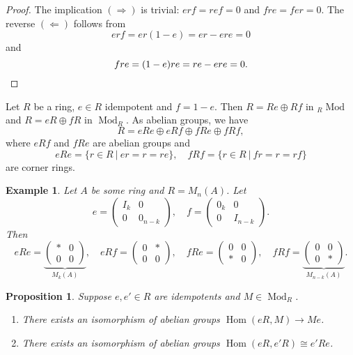\documentclass[10pt, a4paper]{article}
\newtheorem{proposition}[thm]{Proposition}
\newtheorem{example}[thm]{Example}
\newenvironment{noticeC}{%
  \tcolorbox[%
  notitle,
  empty,
  enhanced,  %
  breakable,
  coltext=black, 
  fontupper=\rmfamily,
  noparskip,
  sharp corners,
  boxrule=-1pt,  %
  frame hidden,
  left=7pt,  %
  right=7pt,
  top=5pt,
  bottom=5pt,
  before skip=2.5ex plus 2pt,
  after skip=2.5ex plus 2pt,
  overlay unbroken and last={%
  },
  ]}
{\endtcolorbox}
\newenvironment{myproof}%
  {\begin{noticeC}\begin{proof}}%
  {\end{proof}\end{noticeC}}
\DeclareMathOperator{\ho}{Hom}
\DeclareMathOperator{\mo}{Mod}
\begin{document}
\begin{myproof}
  The implication $(\Rightarrow)$ is trivial: $erf = ref = 0$ and $fre = fer = 0$.
  The reverse $(\Leftarrow)$ follows from 
  $$erf = er(1 - e) = er - ere = 0$$
  and \begin{equation*}
    fre = (1 - e) re = re - ere = 0. \qedhere
  \end{equation*}
\end{myproof}

Let $R$ be a ring, $e \in R$ idempotent and $f = 1 - e$.
Then $R = Re \oplus Rf$ in ${}_R \mo$ and $R = eR \oplus fR$ in $\mo_R$.
As abelian groups, we have $$R = eRe \oplus eRf \oplus fRe \oplus fRf,$$
where $eRf$ and $fRe$ are abelian groups and 
$$eRe = \{r \in R\ |\ er = r = re\},\quad fRf = \{ r \in R\ |\ fr = r = rf \}$$
are corner rings.

\begin{example}
  Let $A$ be some ring and $R = M_n (A)$.
  Let $$e = \begin{pmatrix}
    I_k & 0\\
    0 & 0_{n - k}
  \end{pmatrix},\quad f = \begin{pmatrix}
    0_k & 0\\
    0 & I_{n - k}
  \end{pmatrix}.$$
  Then $$eRe = \underbrace{\begin{pmatrix}
    * & 0\\
    0 & 0
  \end{pmatrix}}_{M_k (A)},\quad eRf = \begin{pmatrix}
    0 & *\\
    0 & 0
  \end{pmatrix},\quad fRe = \begin{pmatrix}
    0 & 0\\
    * & 0
  \end{pmatrix},\quad fRf = \underbrace{\begin{pmatrix}
    0 & 0\\
    0 & *
  \end{pmatrix}}_{M_{n - k} (A)}.$$
\end{example}

\begin{proposition}
  Suppose $e, e' \in R$ are idempotents and $M \in \mo _R$.
  \begin{enumerate}
    \item There exists an isomorphism of abelian groups $\ho (eR, M) \to Me$.
    \item There exists an isomorphism of abelian groups $\ho (eR, e'R) \cong e' R e$.
  \end{enumerate}
\end{proposition}
\end{document}
